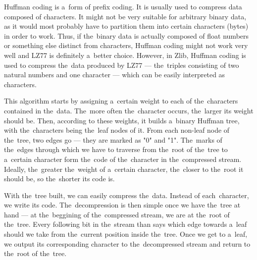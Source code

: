 Huffman coding is a~form of prefix coding. It is usually used to compress data composed of characters. It might not be very suitable for arbitrary binary data, as it would most probably have to partition them into certain characters (bytes) in order to work. Thus, if the~binary data is actually composed of float numbers or something else distinct from characters, Huffman coding might not work very well and LZ77 is definitely a~better choice. However, in Zlib, Huffman coding is used to compress the~data produced by LZ77 --- the~triples consisting of two natural numbers and one character --- which can be easily interpreted as characters.

This algorithm starts by assigning a~certain weight to each of the~characters contained in the~data. The~more often the~character occurs, the~larger its weight should be. Then, according to these weights, it builds a~binary Huffman tree, with the~characters being the~leaf nodes of it. From each non-leaf node of the~tree, two edges go --- they are marked as "0" and "1". The~marks of the~edges through which we have to traverse from the~root of the~tree to a~certain character form the~code of the~character in the~compressed stream. Ideally, the~greater the~weight of a~certain character, the~closer to the~root it should be, so the~shorter its code is.

With the~tree built, we can easily compress the~data. Instead of each~character, we write its code. The~decompression is then simple once we have the~tree at hand --- at the~beggining of the~compressed stream, we are at the~root of the~tree. Every following bit in the~stream than says which edge towards a~leaf should we take from the~current position inside the~tree. Once we get to a~leaf, we output its corresponding character to the~decompressed stream and return to the~root of the~tree.


